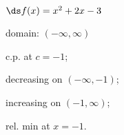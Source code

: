 {$\ds f(x) =x^2+2x-3$
}
{domain: $(-\infty,\infty)$

c.p. at $c=-1$; 

decreasing on $(-\infty,-1)$;

increasing on $(-1,\infty)$;

rel. min at $x=-1$.
}
